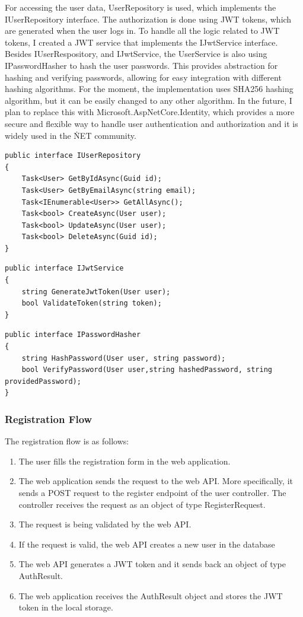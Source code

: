 For accessing the user data, UserRepository is used, which implements the IUserRepository interface.
The authorization is done using JWT tokens, 
which are generated when the user logs in. To handle all the logic related to 
JWT tokens, I created a JWT service that implements the IJwtService interface.
Besides IUserRespository, and IJwtService, the UserService is also using
IPasswordHasher to hash the user passwords. This provides abstraction
for hashing and verifying passwords, 
allowing for easy integration with different hashing algorithms. For the moment,
the implementation uses SHA256 hashing algorithm, 
but it can be easily changed to any other algorithm. In the future, I plan to replace
this with Microsoft.AspNetCore.Identity, 
which provides a more secure and flexible way to handle user 
authentication and authorization and it is widely used in the \.NET community.

\begin{lstlisting}[caption={User Repository interface}]
public interface IUserRepository
{
    Task<User> GetByIdAsync(Guid id);
    Task<User> GetByEmailAsync(string email);
    Task<IEnumerable<User>> GetAllAsync();
    Task<bool> CreateAsync(User user);
    Task<bool> UpdateAsync(User user);
    Task<bool> DeleteAsync(Guid id);
}
\end{lstlisting}

\begin{lstlisting}[caption={JWT Service interface}]
public interface IJwtService
{
    string GenerateJwtToken(User user);
    bool ValidateToken(string token);
}
\end{lstlisting}

\begin{lstlisting}[caption={Password Hasher interface}]
public interface IPasswordHasher
{
    string HashPassword(User user, string password);
    bool VerifyPassword(User user,string hashedPassword, string providedPassword);
}
\end{lstlisting}

\subsubsection{Registration Flow}
The registration flow is as follows:
\begin{enumerate}
    \item The user fills the registration form in the web application.
    \item The web application sends the request to the web API. More specifically, 
    it sends a POST request to the register endpoint of the user controller. The controller
    receives the request as an object of type RegisterRequest.
    \item The request is being validated by the web API.
    \item If the request is valid, the web API creates a new user in the database
    \item The web API generates a JWT token and it sends back an object of type AuthResult.
    \item The web application receives the AuthResult object and stores the JWT token in the local storage.
\end{enumerate}

